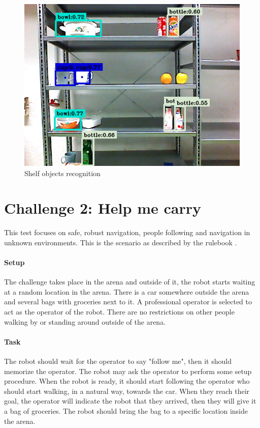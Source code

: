 \documentclass[a4paper, twocolumn]{article}
\begin{document}
    \begin{figure}
        \includegraphics[width=\columnwidth]{../img/yolo_shelf.png}
        \caption{Shelf objects recognition}
        \label{shelf_recog}
    \end{figure}

    \section{Challenge 2: Help me carry}

    This test focuses on safe, robust navigation, people following and navigation in unknown environments. This is the scenario as described by the rulebook \cite{rulebook2017}.\\

    \paragraph{Setup} The challenge takes place in the arena and outside of it, the robot starts waiting at a random location in the arena. There is a car somewhere outside the arena and several bags with groceries next to it. A professional operator is selected to act as the operator of the robot. There are no restrictions on other people walking by or standing around outside of the arena.

    \paragraph{Task} The robot should wait for the operator to say "follow me", then it should memorize the operator. The robot may ask the operator to perform some setup procedure. When the robot is ready, it should start following the operator who should start walking, in a natural way, towards the car. When they reach their goal, the operator will indicate the robot that they arrived, then they will give it a bag of groceries. The robot should bring the bag to a specific location inside the arena.
\end{document}
